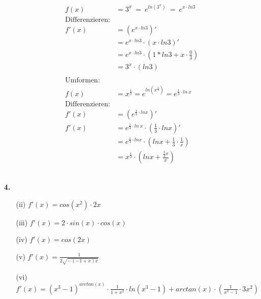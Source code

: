 \documentclass[a4paper,11pt]{article}
\begin{document}
\begin{enumerate}
\begin{enumerate}
\begin{align*}
                            f(x) &= 3^x \ = \ e^{ln(3^x)} \ = \  e^{x \cdot ln3} \\
                            \text{Differenzieren:}& \\
                            f'(x) &= \left(e^{x \cdot ln3} \right)' \\
                            &= e^{x \cdot ln3} \cdot \left(x \cdot ln3 \right)'\\
                            &= e^{x \cdot ln3} \cdot \left( 1* ln3+x \cdot \frac{0}{3}\right) \\ 
                            &= 3^x  \cdot \left(ln3 \right) \\
                            \\
                            \text{Umformen:} & \\
                            f(x) &= x^{\frac{1}{3}} = e^{ln(x^{\frac{1}{3}})} = e^{\frac{1}{3}\cdot ln\ x} \\
                            \text{Differenzieren:}& \\
                            f'(x) &= \left(e^{\frac{1}{3}\cdot lnx}\right)' \\
                            f'(x) &= e^{\frac{1}{3}\cdot ln\ x} \cdot \left(\frac{1}{3}\cdot ln x\right)' \\
                            &= e^{\frac{1}{3}\cdot ln x} \cdot \left( ln x + \frac{1}{3}  \cdot \frac{1}{x} \right) \\
                            &= x^{\frac{1}{3}} \cdot \left(ln x + \frac{\frac{1}{3}x}{x} \right) \\ \\ \\
                        \end{align*}             
            \end{enumerate}

        \item[\textbf{4.}]
            \begin{enumerate}
                \item[(ii)] 
                   $ f'(x)= cos(x^2) \cdot 2x$
                \item[(iii)]
                    $f'(x)= 2 \cdot sin(x) \cdot cos(x)$
                \item[(iv)]
                    $f'(x) = cos(2x)$
                \item[(v)]
                    $f'(x) = \frac{1}{2\sqrt{-(-1+x)x}}$
                \item[(vi)]
                    $ f'(x)= (x^3 - 1)^{arctan(x)} \cdot \frac{1}{1+x^2} \cdot ln(x^3 - 1) + arctan(x) \cdot \left( \frac{1}{x^3-1} \cdot 3x^2 \right) $    
            \end{enumerate} 


\end{enumerate}
\end{document}
